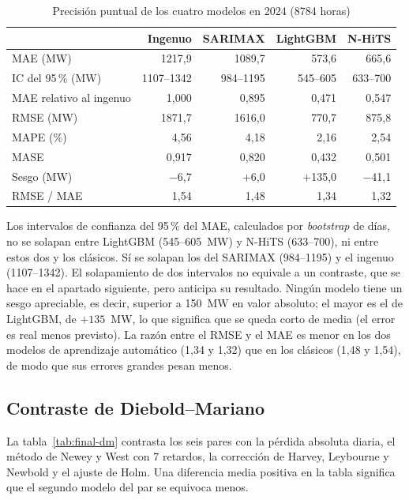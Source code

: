 \begin{table}[htbp]
	\centering
	\caption{Precisión puntual de los cuatro modelos en 2024 (8784 horas)}
	\label{tab:final-puntuales}
	\small
	\begin{tabular}{lrrrr}
		\hline
		 & \textbf{Ingenuo} & \textbf{SARIMAX} & \textbf{LightGBM} & \textbf{N-HiTS} \\
		\hline
		MAE (MW) & 1217,9 & 1089,7 & 573,6 & 665,6 \\
		\quad IC del 95\,\% (MW) & 1107--1342 & 984--1195 & 545--605 & 633--700 \\
		MAE relativo al ingenuo & 1,000 & 0,895 & 0,471 & 0,547 \\
		RMSE (MW) & 1871,7 & 1616,0 & 770,7 & 875,8 \\
		MAPE (\%) & 4,56 & 4,18 & 2,16 & 2,54 \\
		MASE & 0,917 & 0,820 & 0,432 & 0,501 \\
		Sesgo (MW) & $-$6,7 & $+$6,0 & $+$135,0 & $-$41,1 \\
		RMSE / MAE & 1,54 & 1,48 & 1,34 & 1,32 \\
		\hline
	\end{tabular}
\end{table}


Los intervalos de confianza del 95\,\% del MAE, calculados por
\textit{bootstrap} de días, no se solapan entre LightGBM (545--605~MW) y
N-HiTS (633--700), ni entre estos dos y los clásicos. Sí se solapan los del
SARIMAX (984--1195) y el ingenuo (1107--1342). El solapamiento de dos
intervalos no equivale a un contraste, que se hace en el apartado siguiente,
pero anticipa su resultado. Ningún modelo tiene un sesgo apreciable, es decir,
superior a 150~MW en valor absoluto; el mayor es el de LightGBM, de $+135$~MW,
lo que significa que se queda corto de media (el error es real menos previsto).
La razón entre el RMSE y el MAE es menor en los dos modelos de aprendizaje
automático (1,34 y 1,32) que en los clásicos (1,48 y 1,54), de modo que
sus errores grandes pesan menos.

\subsection{Contraste de Diebold--Mariano}\label{sec:final-dm}

La tabla~\ref{tab:final-dm} contrasta los seis pares con la pérdida absoluta
diaria, el método de Newey y West con 7 retardos, la corrección de Harvey,
Leybourne y Newbold y el ajuste de Holm. Una diferencia media positiva en la
tabla significa que el segundo modelo del par se equivoca menos.

